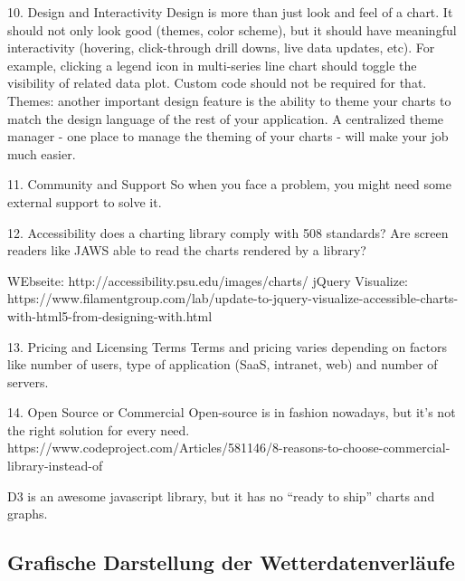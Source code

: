 10. Design and Interactivity
Design is more than just look and feel of a chart. It should not only look good (themes, color scheme), but it should have meaningful interactivity (hovering, click-through drill downs, live data updates, etc). For example, clicking a legend icon in multi-series line chart should toggle the visibility of related data plot. Custom code should not be required for that. Themes: another important design feature is the ability to theme your charts to match the design language of the rest of your application. A centralized theme manager - one place to manage the theming of your charts - will make your job much easier.


11. Community and Support
So when you face a problem, you might need some external support to solve it.

12. Accessibility
 does a charting library comply with 508 standards? Are screen readers like JAWS able to read the charts rendered by a library?

 WEbseite: http://accessibility.psu.edu/images/charts/
 jQuery Visualize: https://www.filamentgroup.com/lab/update-to-jquery-visualize-accessible-charts-with-html5-from-designing-with.html

13. Pricing and Licensing Terms
 Terms and pricing varies depending on factors like number of users, type of application (SaaS, intranet, web) and number of servers.

14. Open Source or Commercial
 Open-source is in fashion nowadays, but it’s not the right solution for every need.
 https://www.codeproject.com/Articles/581146/8-reasons-to-choose-commercial-library-instead-of



 D3 is an awesome javascript library, but it has no “ready to ship” charts and graphs.


\subsection{Grafische Darstellung der Wetterdatenverläufe}
\newline
{}\newline
{}\newline


